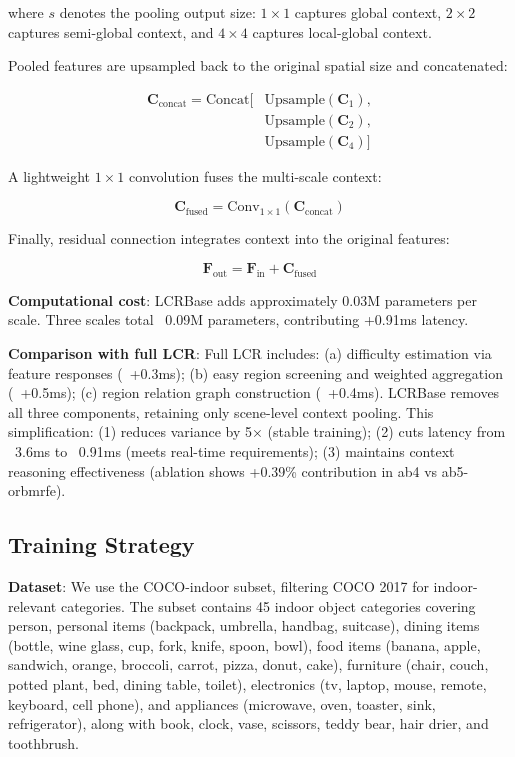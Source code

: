 \documentclass[journal]{IEEEtran}
\begin{document}
where $s$ denotes the pooling output size: $1\times1$ captures global context, $2\times2$ captures semi-global context, and $4\times4$ captures local-global context.

Pooled features are upsampled back to the original spatial size and concatenated:

\begin{equation}
\begin{aligned}
\mathbf{C}_{\text{concat}} = \text{Concat}[&\text{Upsample}(\mathbf{C}_1), \\
&\text{Upsample}(\mathbf{C}_2), \\
&\text{Upsample}(\mathbf{C}_4)]
\end{aligned}
\end{equation}

A lightweight $1\times1$ convolution fuses the multi-scale context:

\begin{equation}
\mathbf{C}_{\text{fused}} = \text{Conv}_{1\times1}(\mathbf{C}_{\text{concat}})
\end{equation}

Finally, residual connection integrates context into the original features:

\begin{equation}
\mathbf{F}_{\text{out}} = \mathbf{F}_{\text{in}} + \mathbf{C}_{\text{fused}}
\end{equation}

\textbf{Computational cost}: LCRBase adds approximately 0.03M parameters per scale. Three scales total ~0.09M parameters, contributing +0.91ms latency.

\textbf{Comparison with full LCR}: Full LCR includes: (a) difficulty estimation via feature responses (~+0.3ms); (b) easy region screening and weighted aggregation (~+0.5ms); (c) region relation graph construction (~+0.4ms). LCRBase removes all three components, retaining only scene-level context pooling. This simplification: (1) reduces variance by 5× (stable training); (2) cuts latency from ~3.6ms to ~0.91ms (meets real-time requirements); (3) maintains context reasoning effectiveness (ablation shows +0.39\% contribution in ab4 vs ab5-orbmrfe).

\subsection{Training Strategy}

\textbf{Dataset}: We use the COCO-indoor subset, filtering COCO 2017 for indoor-relevant categories. The subset contains 45 indoor object categories covering person, personal items (backpack, umbrella, handbag, suitcase), dining items (bottle, wine glass, cup, fork, knife, spoon, bowl), food items (banana, apple, sandwich, orange, broccoli, carrot, pizza, donut, cake), furniture (chair, couch, potted plant, bed, dining table, toilet), electronics (tv, laptop, mouse, remote, keyboard, cell phone), and appliances (microwave, oven, toaster, sink, refrigerator), along with book, clock, vase, scissors, teddy bear, hair drier, and toothbrush.
\end{document}
